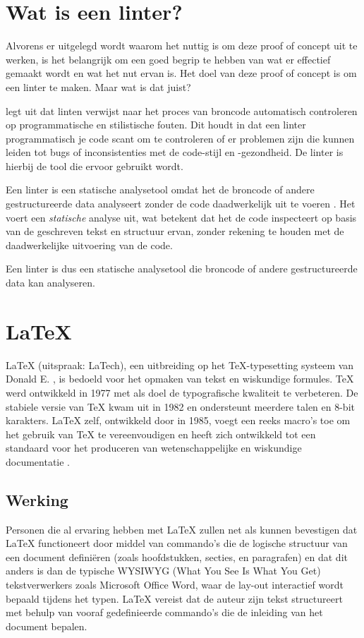 \section{Wat is een linter?}
Alvorens er uitgelegd wordt waarom het nuttig is om deze proof of concept uit te werken, is het belangrijk om een goed begrip te hebben van wat er effectief gemaakt wordt en wat het nut ervan is. Het doel van deze proof of concept is om een linter te maken. Maar wat is dat juist?

\textcite{Kamunya2023} legt uit dat linten verwijst naar het proces van broncode automatisch controleren op programmatische en stilistische fouten. Dit houdt in dat een linter programmatisch je code scant om te controleren of er problemen zijn die kunnen leiden tot bugs of inconsistenties met de code-stijl en -gezondheid. De linter is hierbij de tool die ervoor gebruikt wordt.

Een linter is een statische analysetool omdat het de broncode of andere gestructureerde data analyseert zonder de code daadwerkelijk uit te voeren \autocite{Moeller2023}. Het voert een \emph{statische} analyse uit, wat betekent dat het de code inspecteert op basis van de geschreven tekst en structuur ervan, zonder rekening te houden met de daadwerkelijke uitvoering van de code.

Een linter is dus een statische analysetool die broncode of andere gestructureerde data kan analyseren.

\section{\LaTeX{}}
\LaTeX{} (uitspraak: LaTech), een uitbreiding op het \TeX{}-typesetting systeem van Donald E. \textcite{Knuth1984}, is bedoeld voor het opmaken van tekst en wiskundige formules. TeX werd ontwikkeld in 1977 met als doel de typografische kwaliteit te verbeteren. De stabiele versie van TeX kwam uit in 1982 en ondersteunt meerdere talen en 8-bit karakters. \LaTeX{} zelf, ontwikkeld door \textcite{Lamport1994} in 1985, voegt een reeks macro's toe om het gebruik van TeX te vereenvoudigen en heeft zich ontwikkeld tot een standaard voor het produceren van wetenschappelijke en wiskundige documentatie \autocite{Oetiker2023}.

\subsection{Werking}
Personen die al ervaring hebben met \LaTeX{} zullen net als \textcite{Oetiker2023} kunnen bevestigen dat \LaTeX{} functioneert door middel van commando's die de logische structuur van een document definiëren (zoals hoofdstukken, secties, en paragrafen) en dat dit anders is dan de typische WYSIWYG (What You See Is What You Get) tekstverwerkers zoals Microsoft Office Word, waar de lay-out interactief wordt bepaald tijdens het typen. \LaTeX{} vereist dat de auteur zijn tekst structureert met behulp van vooraf gedefinieerde commando's die de inleiding van het document bepalen.


